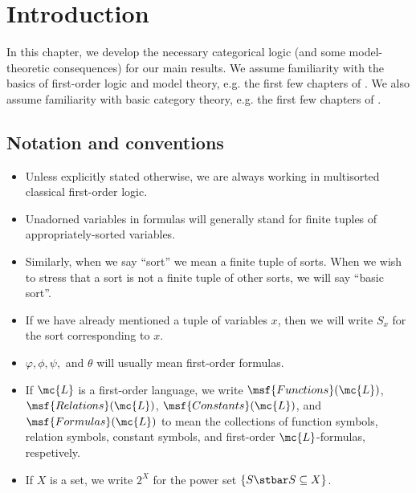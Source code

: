 \section{Introduction}
In this chapter, we develop the necessary categorical logic (and some model-theoretic consequences) for our main results. We assume familiarity with the basics of first-order logic and model theory, e.g. the first few chapters of \cite{marker-model-theory}. We also assume familiarity with basic category theory, e.g. the first few chapters of \cite{maclane-cwm}.

\subsection{Notation and conventions}
\begin{itemize}
\item Unless explicitly stated otherwise, we are always working in multisorted classical first-order logic.
\item Unadorned variables in formulas will generally stand for finite tuples of appropriately-sorted variables.
\item Similarly, when we say ``sort'' we mean a finite tuple of sorts. When we wish to stress that a sort is not a finite tuple of other sorts, we will say ``basic sort''.
\item If we have already mentioned a tuple of variables $x$, then we will write $S_x$ for the sort corresponding to $x$.
\item $\varphi, \phi, \psi,$ and $\theta$ will usually mean first-order formulas.
\item If $\mc{L}$ is a first-order language, we write $\msf{Functions}(\mc{L})$, $\msf{Relations}(\mc{L})$, $\msf{Constants}(\mc{L})$, and $\msf{Formulas}(\mc{L})$ to mean the collections of function symbols, relation symbols, constant symbols, and first-order $\mc{L}$-formulas, respetively.
\item If $X$ is a set, we write $2^X$ for the power set $\{S \stbar S \subseteq X\}$.
\end{itemize}


